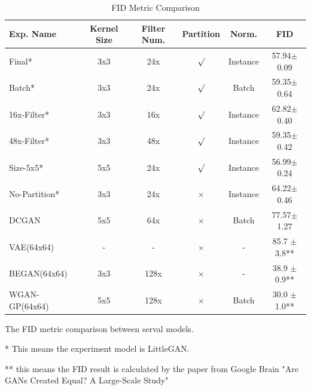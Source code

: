 \begin{table}
    \centering
    \caption{FID Metric Comparison}
    \label{result_fid}
    \begin{threeparttable}
    \begin{tabular}{l|ccccc}
        \hline
        Exp. Name    & Kernel Size & Filter Num.   & Partition          & Norm.         & FID            \\ \hline
        Final*        & 3x3         & 24x           & $\surd$            & Instance      & 57.94$\pm$0.09 \\
        Batch*        & 3x3         & 24x           & $\surd$            & Batch         & 59.35$\pm$0.64 \\
        16x-Filter*   & 3x3         & 16x           & $\surd$            & Instance      & 62.82$\pm$0.40 \\
        48x-Filter*   & 3x3         & 48x           & $\surd$            & Instance      & 59.35$\pm$0.42 \\
        Size-5x5*     & 5x5         & 24x           & $\surd$            & Instance      & 56.99$\pm$0.24 \\
        No-Partition* & 3x3         & 24x           & $\times$           & Instance      & 64.22$\pm$0.46 \\ \hline
        DCGAN        & 5x5         & 64x           & $\times$           & Batch         & 77.57$\pm$1.27 \\ \hline
        VAE(64x64)   & -           & -             & $\times$           & -             & 85.7 $\pm$3.8**  \\
        BEGAN(64x64) & 3x3         & 128x          & $\times$           & -             & 38.9 $\pm$0.9**  \\
        WGAN-GP(64x64) & 5x5       & 128x          & $\times$           & Batch         & 30.0 $\pm$1.0**  \\ \hline
    \end{tabular}
    \begin{tablenotes}
        \item The FID metric comparison between serval models.
        \item[*] This means the experiment model is LittleGAN.
        \item[**] this means the FID result is calculated by the paper from Google Brain "Are GANs Created Equal? A Large-Scale Study"
    \end{tablenotes}
\end{threeparttable}
\end{table}

